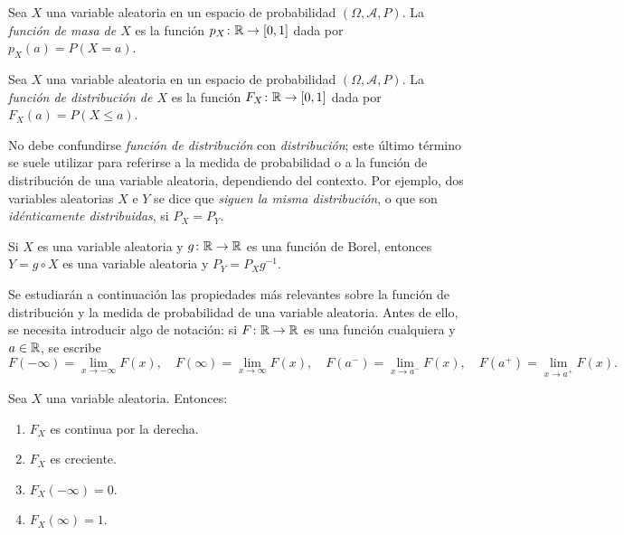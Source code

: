 \documentclass[a4paper, 11pt, extrafontsizes]{memoir}
\begin{document}
\begin{definition}
    Sea $X$ una variable aleatoria en un espacio de probabilidad $(\Omega,\mathcal{A},P)$. La \emph{{función de masa de $X$}} es la función $p_X \colon \mathbb R \to [0,1]$ dada por $p_X(a) = P(X = a)$.
\end{definition}

\begin{definition}
    Sea $X$ una variable aleatoria en un espacio de probabilidad $(\Omega,\mathcal{A},P)$. La \emph{{función de distribución de $X$}} es la función $F_X \colon \mathbb R \to [0,1]$ dada por $F_X(a) = P(X \leq a)$.
\end{definition}

No debe confundirse \emph{función de distribución} con \emph{distribución}; este último término se suele utilizar para referirse a la medida de probabilidad o a la función de distribución de una variable aleatoria, dependiendo del contexto. Por ejemplo, dos variables aleatorias $X$ e $Y$ se dice que \emph{siguen la misma distribución}, o que son \emph{idénticamente distribuidas}, si $P_X = P_Y$.

\begin{proposition}
    Si $X$ es una variable aleatoria y $g \colon \mathbb R \to \mathbb R$ es una función de Borel, entonces $Y = g \circ X$ es una variable aleatoria y $P_Y = P_Xg^{-1}$.
\end{proposition}

Se estudiarán a continuación las propiedades más relevantes sobre la función de distribución y la medida de probabilidad de una variable aleatoria. Antes de ello, se necesita introducir algo de notación: si $F \colon \mathbb R \to \mathbb R$ es una función cualquiera y $a \in \mathbb R$, se escribe
\[F(-\infty) = \lim_{x \to -\infty}F(x), \quad F(\infty) = \lim_{x \to \infty}F(x), \quad F(a^-) = \lim_{x \to a^-} F(x),  \quad F(a^+) = \lim_{x \to a^+} F(x).\]

\begin{proposition}
    Sea $X$ una variable aleatoria. Entonces:
    \begin{enumerate}
        \item $F_X$ es continua por la derecha.
        \item $F_X$ es creciente.
        \item $F_X(-\infty) = 0$.
        \item $F_X(\infty) = 1$.
    \end{enumerate}
\end{proposition}
\end{document}
